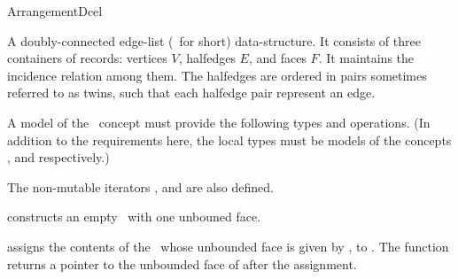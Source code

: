 
\ccRefPageBegin

\begin{ccRefConcept}{ArrangementDcel}

A doubly-connected edge-list (\dcel\ for short) data-structure. It consists
of three containers of records: vertices $V$, halfedges $E$, and faces $F$.
It maintains the incidence relation among them. The halfedges are ordered
in pairs sometimes referred to as twins, such that each halfedge pair
represent an edge.

A model of the \ccRefName\ concept must provide the following types and 
operations. (In addition to the requirements here, the local types 
must be models of the concepts 
,
 and
 respectively.)

\ccTypes

\ccGlue
{}
\ccGlue
{}


\ccGlue
{}
\ccGlue
{}

The non-mutable iterators ,
 and  are also
defined.

\ccCreation
{}
    
   {constructs an empty \dcel\ with one unbouned face.}

   {assigns the contents of the  \dcel\, whose unbounded face
    is given by , to \ccVar{}. The function returns a pointer to
    the unbounded face of \ccVar{} after the assignment.}



\end{ccRefConcept}

